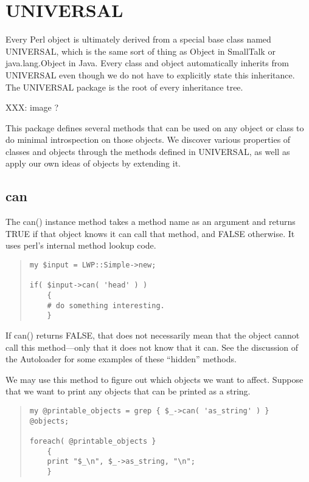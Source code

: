 
    \section{UNIVERSAL}

Every Perl object is ultimately derived from a special base class
named UNIVERSAL, which is the same sort of thing as Object in
SmallTalk or java.lang.Object in Java.  Every class and object
automatically inherits from UNIVERSAL even though we do not have to
explicitly state this inheritance.  The UNIVERSAL package is the root
of every inheritance tree.

\begin{center}
XXX: image ?
\end{center}

This package defines several methods that can be used on any object or
class to do minimal introspection on those objects.  We discover
various properties of classes and objects through the methods defined
in UNIVERSAL, as well as apply our own ideas of objects by extending
it.
        
        \subsection{can}

The can() instance method takes a method name as an argument and
returns TRUE if that object knows it can call that method, and FALSE
otherwise. It uses perl's internal method lookup code.

\begin{quote}
\begin{verbatim}
my $input = LWP::Simple->new;

if( $input->can( 'head' ) )
    {
    # do something interesting.
    }
\end{verbatim}
\end{quote}

If can() returns FALSE, that does not necessarily mean that the object
cannot call this method---only that it does not know that it can.  See
the discussion of the Autoloader for some examples of these ``hidden''
methods.

We may use this method to figure out which objects we want to affect. 
Suppose that we want to print any objects that can be printed as a
string.

\begin{quote}
\begin{verbatim}
my @printable_objects = grep { $_->can( 'as_string' ) } @objects;

foreach( @printable_objects }
    {
    print "$_\n", $_->as_string, "\n";
    }
\end{verbatim}
\end{quote}

